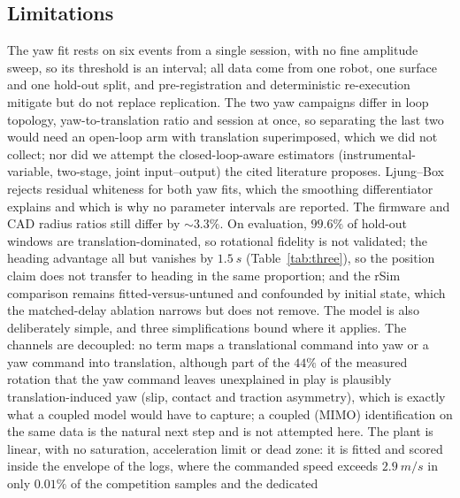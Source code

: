 \subsection{Limitations}
\label{sec:limitations}
The yaw fit rests on six events from a single session, with no fine amplitude
sweep, so its threshold is an interval; all data come from one robot, one
surface and one hold-out split, and pre-registration and deterministic
re-execution mitigate but do not replace replication. The two yaw campaigns
differ in loop topology, yaw-to-translation ratio and session at once, so
separating the last two would need an open-loop arm with translation
superimposed, which we did not collect; nor did we attempt the closed-loop-aware
estimators (instrumental-variable, two-stage, joint input--output) the cited
literature proposes. Ljung--Box rejects residual whiteness for both yaw fits,
which the smoothing differentiator explains and which is why no parameter
intervals are reported. The firmware and CAD radius ratios still differ by
${\sim}3.3\%$. On evaluation, $99.6\%$ of hold-out windows are
translation-dominated, so rotational fidelity is not validated; the heading
advantage all but vanishes by $\SI{1.5}{s}$ (Table~\ref{tab:three}), so the
position claim does not transfer to heading in the same proportion; and the
rSim comparison remains fitted-versus-untuned and confounded by
initial state, which the matched-delay ablation narrows but does not remove.
The model is also deliberately simple, and three simplifications bound where it
applies. The channels are decoupled: no term maps a translational command into
yaw or a yaw command into translation, although part of the $44\%$ of the
measured rotation that the yaw command leaves unexplained in play is plausibly
translation-induced yaw (slip, contact and traction asymmetry), which is exactly
what a coupled model would have to capture; a coupled (MIMO) identification on
the same data is the natural next step and is not attempted here. The plant is
linear, with no saturation, acceleration limit or dead zone: it is fitted and
scored inside the envelope of the logs, where the commanded speed exceeds
$\SI{2.9}{m/s}$ in only $0.01\%$ of the competition samples and the dedicated
